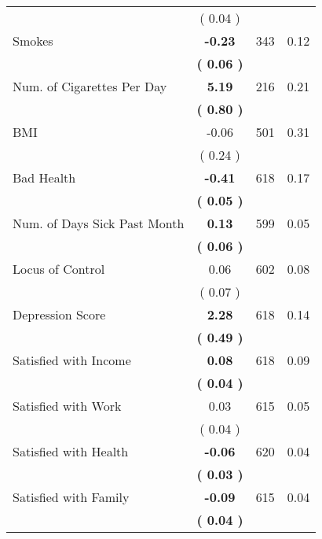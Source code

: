 \begin{tabular}{lccc}
 & (     0.04 ) & \\
Smokes & \textbf{    -0.23} & 343 &      0.12 \\ 
 & \textbf{(     0.06 )} & \\
Num. of Cigarettes Per Day & \textbf{     5.19} & 216 &      0.21 \\ 
 & \textbf{(     0.80 )} & \\
BMI &     -0.06 & 501 &      0.31 \\ 
 & (     0.24 ) & \\
Bad Health & \textbf{    -0.41} & 618 &      0.17 \\ 
 & \textbf{(     0.05 )} & \\
Num. of Days Sick Past Month & \textbf{     0.13} & 599 &      0.05 \\ 
 & \textbf{(     0.06 )} & \\
Locus of Control &      0.06 & 602 &      0.08 \\ 
 & (     0.07 ) & \\
Depression Score & \textbf{     2.28} & 618 &      0.14 \\ 
 & \textbf{(     0.49 )} & \\
Satisfied with Income & \textbf{     0.08} & 618 &      0.09 \\ 
 & \textbf{(     0.04 )} & \\
Satisfied with Work &      0.03 & 615 &      0.05 \\ 
 & (     0.04 ) & \\
Satisfied with Health & \textbf{    -0.06} & 620 &      0.04 \\ 
 & \textbf{(     0.03 )} & \\
Satisfied with Family & \textbf{    -0.09} & 615 &      0.04 \\ 
 & \textbf{(     0.04 )} & \\
\bottomrule
\end{tabular}
